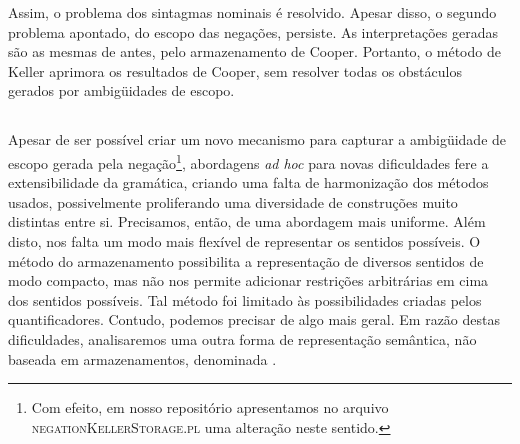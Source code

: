 Assim, o problema dos sintagmas nominais é resolvido. Apesar disso, o segundo problema apontado, do escopo das negações, persiste. As interpretações geradas são as mesmas de antes, pelo armazenamento de Cooper.  Portanto, o método de Keller aprimora os resultados de Cooper, sem resolver todas os obstáculos gerados por ambigüidades de escopo.

\subsection{}

Apesar de ser possível criar um novo mecanismo para capturar a ambigüidade de escopo gerada pela negação\footnote{Com efeito, em nosso repositório apresentamos no arquivo \textsc{negationKellerStorage.pl} uma alteração neste sentido.}, abordagens \textit{ad hoc} para novas dificuldades fere a extensibilidade da gramática, criando uma falta de harmonização dos métodos usados, possivelmente proliferando uma diversidade de construções muito distintas entre si. Precisamos, então, de uma abordagem mais uniforme. 
Além disto, nos falta um modo mais flexível de representar os sentidos possíveis. O método do armazenamento possibilita a representação de diversos sentidos de modo compacto, mas não nos permite adicionar restrições arbitrárias em cima dos sentidos possíveis. Tal método foi limitado às possibilidades criadas pelos quantificadores. Contudo, podemos precisar de algo mais geral. Em razão destas dificuldades, analisaremos uma outra forma de representação semântica, não baseada em armazenamentos, denominada .

